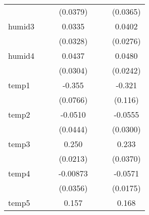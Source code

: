 {\begin{tabular}{l*{6}{c}}
            &                     &                     &    (0.0379)         &                     &                     &    (0.0365)         \\
[1em]
humid3      &                     &                     &      0.0335         &                     &                     &      0.0402         \\
            &                     &                     &    (0.0328)         &                     &                     &    (0.0276)         \\
[1em]
humid4      &                     &                     &      0.0437         &                     &                     &      0.0480         \\
            &                     &                     &    (0.0304)         &                     &                     &    (0.0242)         \\
[1em]
temp1       &                     &                     &      -0.355\sym{***}&                     &                     &      -0.321\sym{*}  \\
            &                     &                     &    (0.0766)         &                     &                     &     (0.116)         \\
[1em]
temp2       &                     &                     &     -0.0510         &                     &                     &     -0.0555         \\
            &                     &                     &    (0.0444)         &                     &                     &    (0.0300)         \\
[1em]
temp3       &                     &                     &       0.250\sym{***}&                     &                     &       0.233\sym{***}\\
            &                     &                     &    (0.0213)         &                     &                     &    (0.0370)         \\
[1em]
temp4       &                     &                     &    -0.00873         &                     &                     &     -0.0571\sym{**} \\
            &                     &                     &    (0.0356)         &                     &                     &    (0.0175)         \\
[1em]
temp5       &                     &                     &       0.157\sym{*}  &                     &                     &       0.168\sym{**} \\

\end{tabular}}
